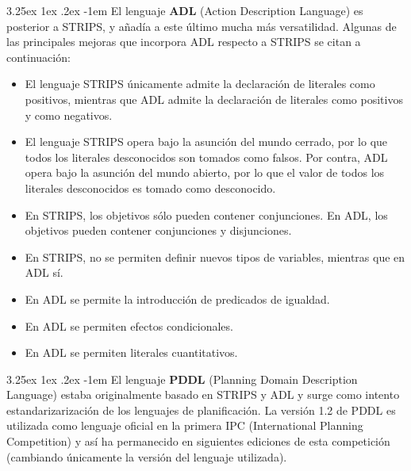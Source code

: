 \documentclass{article}
\makeatletter
\newcommand{\comment}[1]{}
\newcounter{subsubsubsection}
\renewcommand\paragraph{\@startsection{paragraph}{5}{\z@}%
  {3.25ex \@plus1ex \@minus.2ex}%
  {-1em}%
  {\normalfont\normalsize\bfseries}}
\makeatother
\begin{document}


\paragraph{}
El lenguaje \textbf{ADL} (Action Description Language)\cite{adl} es posterior a STRIPS, y añadía a este último mucha más versatilidad. Algunas de las principales mejoras que incorpora ADL respecto a STRIPS se citan a continuación:
\begin{itemize}
    
    \item El lenguaje STRIPS únicamente admite la declaración de literales como positivos, mientras que ADL admite la declaración de literales como positivos y como negativos.
    
    \item El lenguaje STRIPS opera bajo la asunción del mundo cerrado\cite{cwa}, por lo que todos los literales desconocidos son tomados como falsos. Por contra, ADL opera bajo la asunción del mundo abierto, por lo que el valor de todos los literales desconocidos es tomado como desconocido.
    
    \item En STRIPS, los objetivos sólo pueden contener conjunciones. En ADL, los objetivos pueden contener conjunciones y disjunciones.
    
    \item En STRIPS, no se permiten definir nuevos tipos de variables, mientras que en ADL sí.
    
    \item En ADL se permite la introducción de predicados de igualdad.
    
    \item En ADL se permiten efectos condicionales.
    
    \item En ADL se permiten literales cuantitativos.
    
    \comment{Sacado de Wikipedia, de la página de ADL. Buscar una fuente más fiable para citar estas diferencias, como un libro.}
    
\end{itemize}




\paragraph{}
El lenguaje \textbf{PDDL} (Planning Domain Description Language)\cite{pddl} estaba originalmente basado en STRIPS y ADL y surge como intento estandarizarización de los lenguajes de planificación. La versión 1.2 de PDDL es utilizada como lenguaje oficial en la primera IPC (International Planning Competition) y así ha permanecido en siguientes ediciones de esta competición (cambiando únicamente la versión del lenguaje utilizada).
\end{document}
